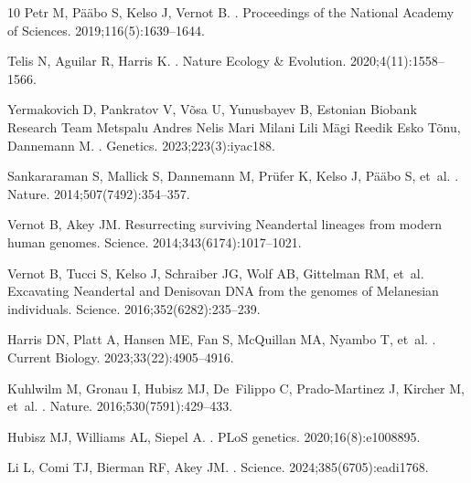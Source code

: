 \documentclass[10pt,letterpaper]{article}
\begin{document}
\begin{thebibliography}{10}
Petr M, P{\"a}{\"a}bo S, Kelso J, Vernot B.
.
\newblock Proceedings of the National Academy of Sciences.
  2019;116(5):1639--1644.

Telis N, Aguilar R, Harris K.
.
\newblock Nature Ecology \& Evolution. 2020;4(11):1558--1566.

Yermakovich D, Pankratov V, V{\~o}sa U, Yunusbayev B, {Estonian Biobank
  Research Team Metspalu Andres Nelis Mari Milani Lili M{\"a}gi Reedik Esko
  T{\~o}nu}, Dannemann M.
.
\newblock Genetics. 2023;223(3):iyac188.

Sankararaman S, Mallick S, Dannemann M, Pr{\"u}fer K, Kelso J, P{\"a}{\"a}bo S,
  et~al.
.
\newblock Nature. 2014;507(7492):354--357.

Vernot B, Akey JM.
\newblock Resurrecting surviving Neandertal lineages from modern human genomes.
\newblock Science. 2014;343(6174):1017--1021.

Vernot B, Tucci S, Kelso J, Schraiber JG, Wolf AB, Gittelman RM, et~al.
\newblock Excavating Neandertal and Denisovan DNA from the genomes of
  Melanesian individuals.
\newblock Science. 2016;352(6282):235--239.

Harris DN, Platt A, Hansen ME, Fan S, McQuillan MA, Nyambo T, et~al.
.
\newblock Current Biology. 2023;33(22):4905--4916.

Kuhlwilm M, Gronau I, Hubisz MJ, De~Filippo C, Prado-Martinez J, Kircher M,
  et~al.
.
\newblock Nature. 2016;530(7591):429--433.

Hubisz MJ, Williams AL, Siepel A.
.
\newblock PLoS genetics. 2020;16(8):e1008895.

Li L, Comi TJ, Bierman RF, Akey JM.
.
\newblock Science. 2024;385(6705):eadi1768.


\end{thebibliography}
\end{document}
